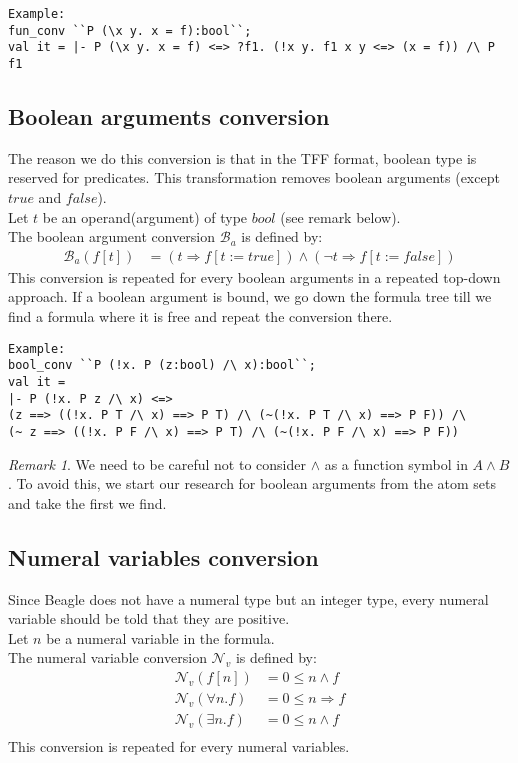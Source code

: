 \documentclass[a4paper, 11pt]{article}
\theoremstyle{plain}
\theoremstyle{definition}
\theoremstyle{remark}
\newtheorem*{remark}{Remark}
\begin{document}
\scriptsize
\begin{Verbatim}[frame=single]
Example:
fun_conv ``P (\x y. x = f):bool``;
val it = |- P (\x y. x = f) <=> ?f1. (!x y. f1 x y <=> (x = f)) /\ P f1
\end{Verbatim} 
\normalsize

  
\subsection{Boolean arguments conversion}
The reason we do this conversion is that in the TFF format, boolean type is reserved for predicates.
This transformation removes boolean arguments (except $true$ and $false$).
\\Let $t$ be an operand(argument) of type $bool$ (see remark below).
\\The boolean argument conversion $\mathcal{B}_a$ is defined by: 
\[\begin{aligned}
  \mathcal{B}_a (f[t]) &= (t \Rightarrow f[t := true]) \wedge (\neg t \Rightarrow f[t := false]) 
\end{aligned}\]
This conversion is repeated for every boolean arguments in a repeated top-down approach. If a boolean argument is bound, we go down the formula tree till we find a formula where it is free and repeat the conversion there.

\scriptsize
\begin{Verbatim}[frame=single]
Example:
bool_conv ``P (!x. P (z:bool) /\ x):bool``;
val it =
|- P (!x. P z /\ x) <=>
(z ==> ((!x. P T /\ x) ==> P T) /\ (~(!x. P T /\ x) ==> P F)) /\
(~ z ==> ((!x. P F /\ x) ==> P T) /\ (~(!x. P F /\ x) ==> P F))
\end{Verbatim} 
\normalsize

\begin{remark}
We need to be careful not to consider $\wedge$ as a function symbol in $A \wedge B$. To avoid this, we start our research for boolean arguments from the atom sets and take the first we find.
\end{remark}


\subsection{Numeral variables conversion}
Since Beagle does not have a numeral type but an integer type, every numeral variable should be told that they are positive.
\\Let $n$ be a numeral variable in the formula.
\\The numeral variable conversion $\mathcal{N}_v$ is defined by:
\[\begin{aligned}
  \mathcal{N}_v(f[n]) &= 0 \leq n \wedge f\\
  \mathcal{N}_v(\forall n. f) &= 0 \leq n \Rightarrow f\\ 
  \mathcal{N}_v(\exists n. f) &= 0 \leq n \wedge f \\
  \end{aligned}
  \]
 This conversion is repeated for every numeral variables.
\end{document}
